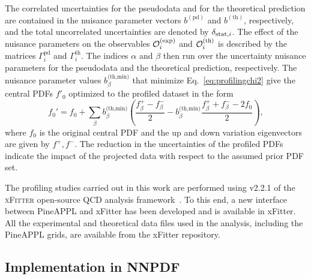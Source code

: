 The correlated uncertainties for the pseudodata and for the theoretical prediction 
are contained in the nuisance parameter vectors $b^{(\textrm{pd})}$ and $b^{(\textrm{th})}$, respectively, and the total uncorrelated uncertainties are denoted by $\delta_{{\rm stat},i}$.
%
The effect of the nuisance parameters
on the observables $\mathcal{O}_i^{\rm (exp)}$ and $\mathcal{O}_i^{\rm (th)}$
is described by the matrices $\Gamma_i^{\textrm{pd}}$ and $\Gamma_i^{\textrm{th}}$.
%
The indices $\alpha$ and $\beta$ then run over the uncertainty nuisance parameters for the pseudodata and the theoretical prediction, respectively.
%
The nuisance parameter values $b_\beta^{\textrm{(th,min)}}$ that minimize Eq.~\eqref{eq:profilingchi2} give the central PDFs $f'_0$ optimized to the profiled dataset in the form
\begin{equation}
f_0' = f_0
      + \sum_\beta b_\beta^{\textrm{(th,min)}} 
        \left(  \frac{f_\beta^+   -  f_\beta^- }{2}
              -    b_\beta^{\textrm{(th,min)}}
                \frac{f_\beta^+ + f_\beta^- - 2f_0}{2}
        \right),
\end{equation}
where $f_0$ is the original central PDF and the up and down variation eigenvectors are given by $f^+, f^-$.
%
The reduction in the uncertainties of the profiled PDFs indicate the impact
of the projected data with respect to the assumed prior PDF set.


The profiling studies carried out in this work are performed using v2.2.1 of the \textsc{xFitter} open-source QCD analysis framework~\cite{Alekhin:2014irh, Bertone:2017tig, xFitter:2022zjb, xFitter:web}.
%
To this end, a new interface between  {\sc\small PineAPPL} and {\sc\small xFitter} has been developed and is available in {\sc\small xFitter}.
%
All the experimental and theoretical data files used in the analysis, including
the  {\sc\small PineAPPL}  grids, are available
from the {\sc\small xFitter} repository.

\subsection{Implementation in NNPDF}
\label{subsec:NNPDF}




